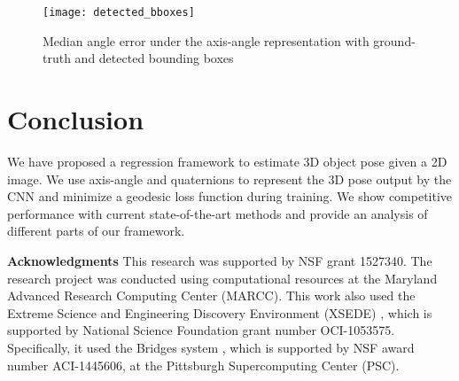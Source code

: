 \documentclass[10pt,twocolumn,letterpaper]{article}
\newcommand{\myparagraph}[1]{\smallskip\noindent\textbf{#1}}
\begin{document}
	\begin{figure}
		\centering
		\texttt{[image: detected\_bboxes]}
		\caption{Median angle error under the axis-angle representation with ground-truth and detected bounding boxes}
		\label{fig:detected}
	\end{figure}

	\section{Conclusion}
	\label{sec:conclusion}
	We have proposed a regression framework to estimate 3D object pose given a 2D image. We use axis-angle and quaternions to represent the 3D pose output by the CNN and minimize a geodesic loss function during training. We show competitive performance with current state-of-the-art methods and provide an analysis of different parts of our framework. 
	
	\myparagraph{Acknowledgments} This research was supported by NSF grant 1527340. The research project was conducted using computational resources at the Maryland Advanced Research Computing Center (MARCC). This work also used the Extreme Science and Engineering Discovery Environment (XSEDE) \cite{XSEDE}, which is supported by National Science Foundation grant number OCI-1053575.  Specifically, it used the Bridges system \cite{Bridges}, which is supported by NSF award number ACI-1445606, at the Pittsburgh Supercomputing Center (PSC).
\end{document}
